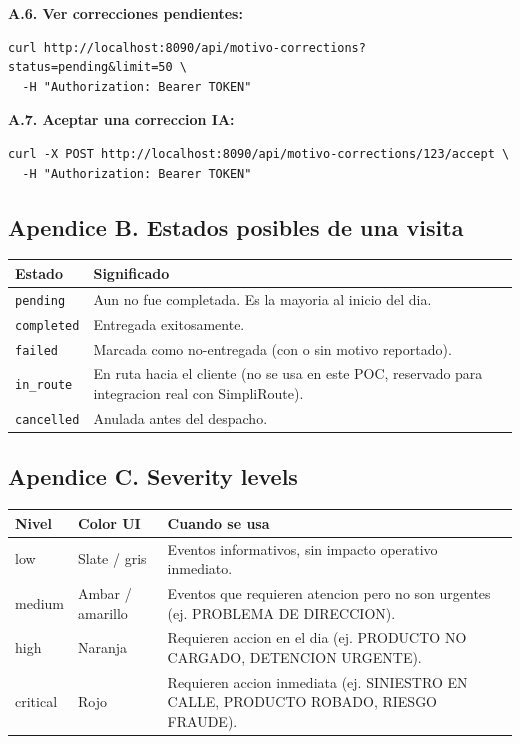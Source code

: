\documentclass[11pt,a4paper]{article}
\begin{document}
\textbf{A.6. Ver correcciones pendientes:}

\begin{lstlisting}
curl http://localhost:8090/api/motivo-corrections?status=pending&limit=50 \
  -H "Authorization: Bearer TOKEN"
\end{lstlisting}

\textbf{A.7. Aceptar una correccion IA:}

\begin{lstlisting}
curl -X POST http://localhost:8090/api/motivo-corrections/123/accept \
  -H "Authorization: Bearer TOKEN"
\end{lstlisting}

\subsection*{Apendice B. Estados posibles de una visita}

\begin{longtable}{p{3.0cm} p{12.5cm}}
\toprule
\textbf{Estado} & \textbf{Significado} \\
\midrule
\endhead
\texttt{pending} & Aun no fue completada. Es la mayoria al inicio del
  dia. \\
\texttt{completed} & Entregada exitosamente. \\
\texttt{failed} & Marcada como no-entregada (con o sin motivo
  reportado). \\
\texttt{in\_route} & En ruta hacia el cliente (no se usa en este POC,
  reservado para integracion real con SimpliRoute). \\
\texttt{cancelled} & Anulada antes del despacho. \\
\bottomrule
\end{longtable}

\subsection*{Apendice C. Severity levels}

\begin{longtable}{p{2.5cm} p{4.0cm} p{8.5cm}}
\toprule
\textbf{Nivel} & \textbf{Color UI} & \textbf{Cuando se usa} \\
\midrule
\endhead
low & Slate / gris &
  Eventos informativos, sin impacto operativo inmediato. \\
medium & Ambar / amarillo &
  Eventos que requieren atencion pero no son urgentes (ej. PROBLEMA
  DE DIRECCION). \\
high & Naranja &
  Requieren accion en el dia (ej. PRODUCTO NO CARGADO, DETENCION
  URGENTE). \\
critical & Rojo &
  Requieren accion inmediata (ej. SINIESTRO EN CALLE, PRODUCTO ROBADO,
  RIESGO FRAUDE). \\
\bottomrule
\end{longtable}
\end{document}
